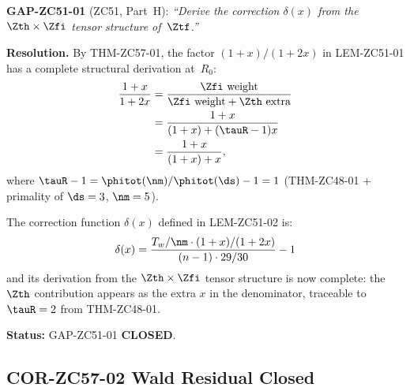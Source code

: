 \documentclass[12pt, a4paper]{article}
\begin{document}
\begin{formalbox}[title={COR-ZC57-01: GAP-ZC51-01 Closed ($R_0$)}]
\textbf{GAP-ZC51-01} (ZC51, Part~H):
\emph{``Derive the correction $\delta(x)$ from the
$\Zth\times\Zfi$ tensor structure of~$\Ztf$.''}

\medskip
\textbf{Resolution.}
By THM-ZC57-01, the factor $(1+x)/(1+2x)$ in LEM-ZC51-01
has a complete structural derivation at~$R_0$:
\begin{align*}
  \frac{1+x}{1+2x}
  &= \frac{\text{$\Zfi$ weight}}{\text{$\Zfi$ weight}
    + \text{$\Zth$ extra}} \\
  &= \frac{1+x}{(1+x) + (\tauR-1)x} \\
  &= \frac{1+x}{(1+x) + x},
\end{align*}
where $\tauR-1=\phitot(\nm)/\phitot(\ds)-1=1$
(THM-ZC48-01 + primality of $\ds=3$, $\nm=5$).

The correction function $\delta(x)$ defined in LEM-ZC51-02 is:
\[
  \delta(x) = \frac{T_w/\nm\cdot(1+x)/(1+2x)}{(n-1)\cdot29/30} - 1
\]
and its derivation from the $\Zth\times\Zfi$ tensor structure
is now complete: the $\Zth$ contribution appears as the extra
$x$ in the denominator, traceable to $\tauR=2$ from THM-ZC48-01.

\textbf{Status:} GAP-ZC51-01 \textbf{CLOSED}.
\end{formalbox}

\subsection{COR-ZC57-02 \quad Wald Residual Closed}
\label{sec:cor02}

\end{document}
